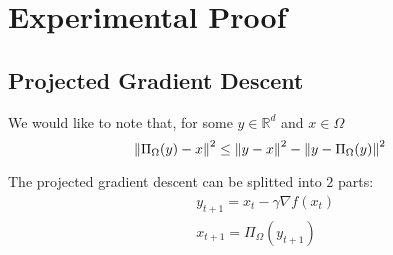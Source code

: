 \section{Experimental Proof}

\subsection{Projected Gradient Descent}

\begin{lemma}
    We would like to note that, for some $y\in \mathbb{R}^d$ and $x\in\Omega$
    \begin{equation*}
        \left\lVert\Pi_\Omega(y) - x\right\rVert^2 \le \left\lVert y - x\right\rVert^2 - \left\lVert y - \Pi_\Omega(y)\right\rVert^2
    \end{equation*}
\end{lemma}

\begin{remark}
    The projected gradient descent can be splitted into $2$ parts:
    \begin{equation*}
    \begin{aligned}
        &y_{t+1}= x_t - \gamma \nabla f(x_t) \\
        &x_{t+1}= \Pi_\Omega(y_{t+1})
    \end{aligned}
    \end{equation*}
\end{remark}
